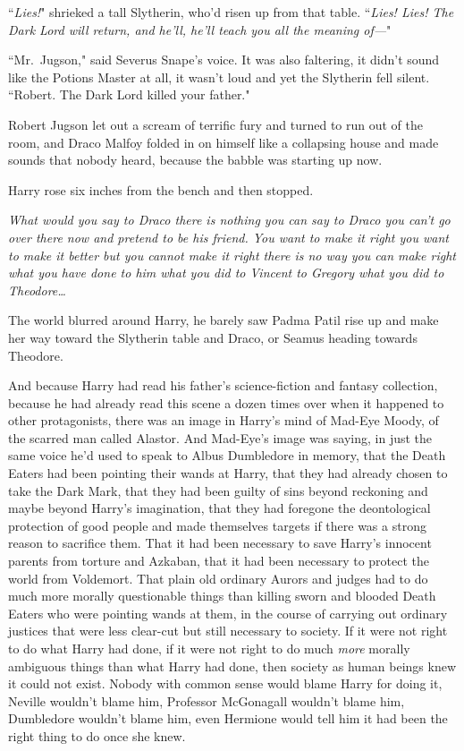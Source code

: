``\emph{Lies!}" shrieked a tall Slytherin, who'd risen up from that table. ``\emph{Lies! Lies! The Dark Lord will return, and he'll, he'll teach you all the meaning of---}"

``Mr.~Jugson," said Severus Snape's voice. It was also faltering, it didn't sound like the Potions Master at all, it wasn't loud and yet the Slytherin fell silent. ``Robert. The Dark Lord killed your father."

Robert Jugson let out a scream of terrific fury and turned to run out of the room, and Draco Malfoy folded in on himself like a collapsing house and made sounds that nobody heard, because the babble was starting up now.

Harry rose six inches from the bench and then stopped.

\emph{What would you say to Draco there is nothing you can say to Draco you can't go over there now and pretend to be his friend. You want to make it right you want to make it better but you cannot make it right there is no way you can make right what you have done to him what you did to Vincent to Gregory what you did to Theodore{\ldots}}

The world blurred around Harry, he barely saw Padma Patil rise up and make her way toward the Slytherin table and Draco, or Seamus heading towards Theodore.

And because Harry had read his father's science-fiction and fantasy collection, because he had already read this scene a dozen times over when it happened to other protagonists, there was an image in Harry's mind of Mad-Eye Moody, of the scarred man called Alastor. And Mad-Eye's image was saying, in just the same voice he'd used to speak to Albus Dumbledore in memory, that the Death Eaters had been pointing their wands at Harry, that they had already chosen to take the Dark Mark, that they had been guilty of sins beyond reckoning and maybe beyond Harry's imagination, that they had foregone the deontological protection of good people and made themselves targets if there was a strong reason to sacrifice them. That it had been necessary to save Harry's innocent parents from torture and Azkaban, that it had been necessary to protect the world from Voldemort. That plain old ordinary Aurors and judges had to do much more morally questionable things than killing sworn and blooded Death Eaters who were pointing wands at them, in the course of carrying out ordinary justices that were less clear-cut but still necessary to society. If it were not right to do what Harry had done, if it were not right to do much \emph{more} morally ambiguous things than what Harry had done, then society as human beings knew it could not exist. Nobody with common sense would blame Harry for doing it, Neville wouldn't blame him, Professor McGonagall wouldn't blame him, Dumbledore wouldn't blame him, even Hermione would tell him it had been the right thing to do once she knew.


